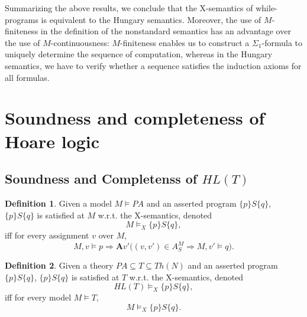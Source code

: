 \documentclass[a4paper,11pt]{article}
\begin{document}
Summarizing the above results, we conclude that the X-semantics of while-programs is equivalent to the Hungary semantics. Moreover, the use of $M$-finiteness in the definition of the nonstandard semantics has an advantage over the use of $M$-continuousness: $M$-finiteness enables us to construct a $\Sigma_1$-formula to uniquely determine the sequence of computation, whereas in the Hungary semantics, we have to verify whether a sequence satisfies the induction axioms for all formulas.

\section{Soundness and completeness of Hoare logic}

\subsection{Soundness and Completenss of $HL(T)$}

\theoremstyle{definition}
\newtheorem{satisfiability_of_asserted_programs_in_models}{Definition}[subsection]
\begin{satisfiability_of_asserted_programs_in_models}\label{satisfiability_of_asserted_programs_in_models}
Given a model $M\models PA$ and an asserted program $\{p\}S\{q\}$, $\{p\}S\{q\}$ is satisfied at $M$ w.r.t. the X-semantics, denoted
\begin{equation*}
M\models_X \{p\}S\{q\},
\end{equation*}
iff for every assignment $v$ over $M$,
\begin{equation*}
M,v\models p \Rightarrow \textbf{A}v'\big((v,v')\in A_S^M \Rightarrow M,v'\models q\big).
\end{equation*}
\end{satisfiability_of_asserted_programs_in_models}

\newtheorem{satisfiability_of_asserted_programs_in_theories}[satisfiability_of_asserted_programs_in_models]{Definition}
\begin{satisfiability_of_asserted_programs_in_theories}\label{satisfiability_of_asserted_programs_in_theories}
Given a theory $PA\subseteq T\subseteq Th(N)$ and an asserted program $\{p\}S\{q\}$, $\{p\}S\{q\}$ is satisfied at $T$ w.r.t. the X-semantics, denoted
\begin{equation*}
HL(T) \models_X \{p\}S\{q\},
\end{equation*}
iff for every model $M\models T$,
\begin{equation*}
M \models_X \{p\}S\{q\}.
\end{equation*}
\end{satisfiability_of_asserted_programs_in_theories}
\end{document}
